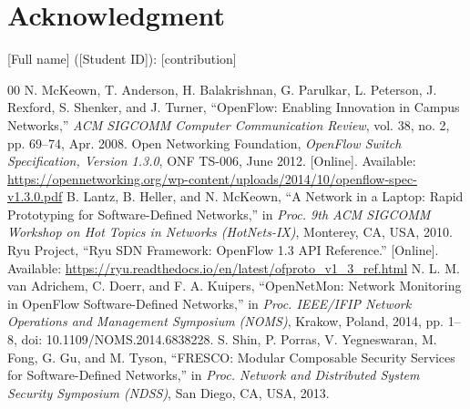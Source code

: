 \documentclass[conference]{IEEEtran}
\begin{document}
\section*{Acknowledgment}
[Full name] ([Student ID]): [contribution]%

\clearpage
\begin{thebibliography}{00}
 N. McKeown, T. Anderson, H. Balakrishnan, G. Parulkar, L. Peterson, J. Rexford, S. Shenker, and J. Turner, ``OpenFlow: Enabling Innovation in Campus Networks,'' \emph{ACM SIGCOMM Computer Communication Review}, vol. 38, no. 2, pp. 69--74, Apr. 2008.
 Open Networking Foundation, \emph{OpenFlow Switch Specification, Version 1.3.0}, ONF TS-006, June 2012. [Online]. Available: \url{https://opennetworking.org/wp-content/uploads/2014/10/openflow-spec-v1.3.0.pdf}
 B. Lantz, B. Heller, and N. McKeown, ``A Network in a Laptop: Rapid Prototyping for Software-Defined Networks,'' in \emph{Proc. 9th ACM SIGCOMM Workshop on Hot Topics in Networks (HotNets-IX)}, Monterey, CA, USA, 2010.
 Ryu Project, ``Ryu SDN Framework: OpenFlow 1.3 API Reference.'' [Online]. Available: \url{https://ryu.readthedocs.io/en/latest/ofproto_v1_3_ref.html}
 N. L. M. van Adrichem, C. Doerr, and F. A. Kuipers, ``OpenNetMon: Network Monitoring in OpenFlow Software-Defined Networks,'' in \emph{Proc. IEEE/IFIP Network Operations and Management Symposium (NOMS)}, Krakow, Poland, 2014, pp. 1--8, doi: 10.1109/NOMS.2014.6838228.
 S. Shin, P. Porras, V. Yegneswaran, M. Fong, G. Gu, and M. Tyson, ``FRESCO: Modular Composable Security Services for Software-Defined Networks,'' in \emph{Proc. Network and Distributed System Security Symposium (NDSS)}, San Diego, CA, USA, 2013.
\end{thebibliography}
\end{document}
